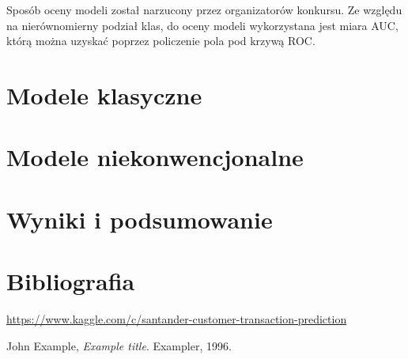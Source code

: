 ﻿\documentclass[12pt]{article}
\begin{document}
Sposób oceny modeli został narzucony przez organizatorów konkursu. Ze względu na nierównomierny podział klas, do oceny modeli wykorzystana jest miara AUC, którą można uzyskać poprzez policzenie pola pod krzywą ROC.


\section{Modele klasyczne}

\section{Modele niekonwencjonalne}

\section{Wyniki i podsumowanie}


\newpage

\section{Bibliografia}
\begin{thebibliography}{9}

\url{https://www.kaggle.com/c/santander-customer-transaction-prediction}

  John Example,
  \textit{Example title}.
  Exampler,
  1996.

\end{thebibliography}
\end{document}
